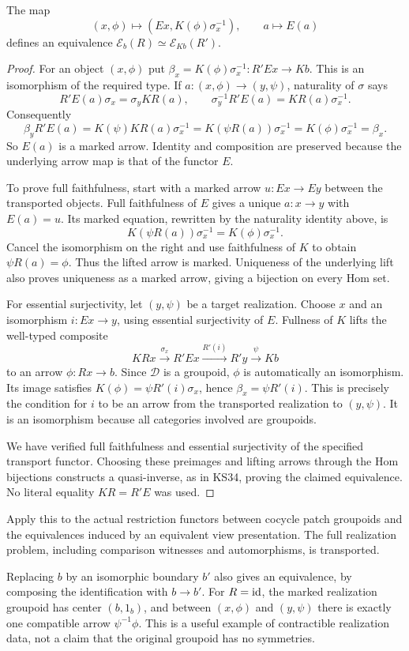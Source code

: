 \begin{theorem}\label{KS39}
The map
\[
 (x,\phi)\longmapsto(Ex,K(\phi)\sigma_x^{-1}),\qquad a\longmapsto E(a)
\]
defines an equivalence \(\mathcal E_b(R)\simeq\mathcal E_{Kb}(R')\).
\end{theorem}
\begin{proof}
For an object $(x,\phi)$ put $\beta_x=K(\phi)\sigma_x^{-1}:R'Ex\to Kb$. This is an isomorphism of the required type. If $a:(x,\phi)\to(y,\psi)$, naturality of $\sigma$ says
\[
 R'E(a)\sigma_x=\sigma_yKR(a),
 \qquad \sigma_y^{-1}R'E(a)=KR(a)\sigma_x^{-1}.
\]
Consequently
\[
 \beta_yR'E(a)
 =K(\psi)KR(a)\sigma_x^{-1}
 =K(\psi R(a))\sigma_x^{-1}
 =K(\phi)\sigma_x^{-1}=\beta_x.
\]
So $E(a)$ is a marked arrow. Identity and composition are preserved because the underlying arrow map is that of the functor $E$.

To prove full faithfulness, start with a marked arrow $u:Ex\to Ey$ between the transported objects. Full faithfulness of $E$ gives a unique $a:x\to y$ with $E(a)=u$. Its marked equation, rewritten by the naturality identity above, is
\[
 K(\psi R(a))\sigma_x^{-1}=K(\phi)\sigma_x^{-1}.
\]
Cancel the isomorphism on the right and use faithfulness of $K$ to obtain $\psi R(a)=\phi$. Thus the lifted arrow is marked. Uniqueness of the underlying lift also proves uniqueness as a marked arrow, giving a bijection on every Hom set.

For essential surjectivity, let $(y,\psi)$ be a target realization. Choose $x$ and an isomorphism $i:Ex\to y$, using essential surjectivity of $E$. Fullness of $K$ lifts the well-typed composite
\[
 KRx\xrightarrow{\sigma_x}R'Ex
 \xrightarrow{R'(i)}R'y\xrightarrow{\psi}Kb
\]
to an arrow $\phi:Rx\to b$. Since $\mathcal D$ is a groupoid, $\phi$ is automatically an isomorphism. Its image satisfies $K(\phi)=\psi R'(i)\sigma_x$, hence $\beta_x=\psi R'(i)$. This is precisely the condition for $i$ to be an arrow from the transported realization to $(y,\psi)$. It is an isomorphism because all categories involved are groupoids.

We have verified full faithfulness and essential surjectivity of the specified transport functor. Choosing these preimages and lifting arrows through the Hom bijections constructs a quasi-inverse, as in KS34, proving the claimed equivalence. No literal equality $KR=R'E$ was used.
\end{proof}
Apply this to the actual restriction functors between cocycle patch groupoids and the equivalences induced by an equivalent view presentation. The full realization problem, including comparison witnesses and automorphisms, is transported.

Replacing \(b\) by an isomorphic boundary \(b'\) also gives an equivalence, by composing the identification with \(b\to b'\). For \(R=\operatorname{id}\), the marked realization groupoid has center \((b,1_b)\), and between \((x,\phi)\) and \((y,\psi)\) there is exactly one compatible arrow \(\psi^{-1}\phi\). This is a useful example of contractible realization data, not a claim that the original groupoid has no symmetries.

